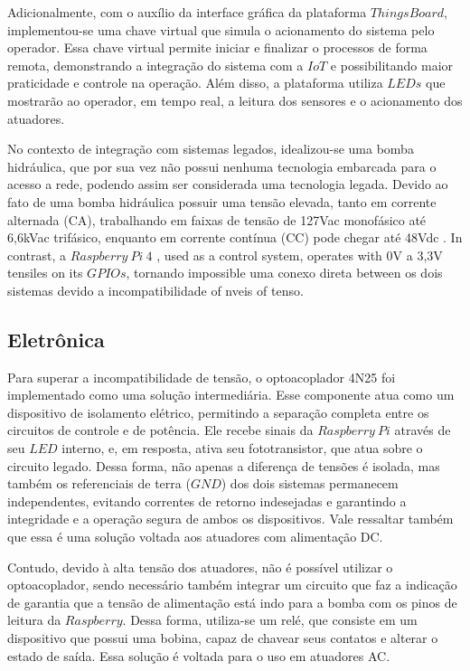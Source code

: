 \documentclass{ecatfg}
\begin{document}
Adicionalmente, com o auxílio da interface gráfica da plataforma $ThingsBoard$, implementou-se uma chave virtual que simula o acionamento do sistema pelo operador. Essa chave virtual permite iniciar e finalizar o processos de forma remota, demonstrando a integração do sistema com a $IoT$ e possibilitando maior praticidade e controle na operação. Além disso, a plataforma utiliza $LEDs$ que mostrarão ao operador, em tempo real, a leitura dos sensores e o acionamento dos atuadores.\par

No contexto de integração com sistemas legados, idealizou-se uma bomba hidráulica, que por sua vez não possui nenhuma tecnologia embarcada para o acesso a rede, podendo assim ser considerada uma tecnologia legada. Devido ao fato de uma bomba hidráulica possuir uma tensão elevada, tanto em corrente alternada (CA), trabalhando em faixas de tensão de 127Vac monofásico até 6,6kVac trifásico, enquanto em corrente contínua (CC) pode chegar até 48Vdc \cite{bomba}. In contrast, a $Raspberry\ Pi\ 4$ \cite{Raspberry_pi_4}, used as a control system, operates with 0V a 3,3V tensiles on its $GPIOs$, tornando impossible uma conexo direta between os dois sistemas devido a incompatibilidade of nveis of tenso. \par

\subsection{Eletrônica}
\label{SeçãoIII2}
Para superar a incompatibilidade de tensão, o optoacoplador 4N25\cite{4n25} foi implementado como uma solução intermediária. Esse componente atua como um dispositivo de isolamento elétrico, permitindo a separação completa entre os circuitos de controle e de potência. Ele recebe sinais da $Raspberry\ Pi$ através de seu $LED$ interno, e, em resposta, ativa seu fototransistor, que atua sobre o circuito legado. Dessa forma, não apenas a diferença de tensões é isolada, mas também os referenciais de terra ($GND$) dos dois sistemas permanecem independentes, evitando correntes de retorno indesejadas e garantindo a integridade e a operação segura de ambos os dispositivos. Vale ressaltar também que essa é uma solução voltada aos atuadores com alimentação DC.\par

Contudo, devido à alta tensão dos atuadores, não é possível utilizar o optoacoplador, sendo necessário também integrar um circuito que faz a indicação de garantia que a tensão de alimentação está indo para a bomba com os pinos de leitura da $Raspberry$. Dessa forma, utiliza-se um relé, que consiste em um dispositivo que possui uma bobina, capaz de chavear seus contatos e alterar o estado de saída. Essa solução é voltada para o uso em atuadores AC.\par
\end{document}
